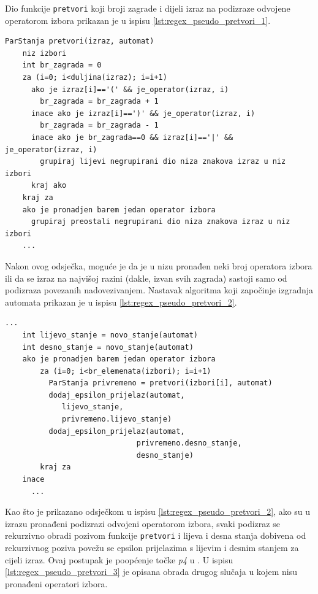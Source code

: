 \documentclass[times, 12pt, utf8]{book}
\begin{document}
Dio funkcije \verb|pretvori| koji broji zagrade i dijeli izraz na podizraze odvojene operatorom izbora prikazan je u ispisu \ref{lst:regex_pseudo_pretvori_1}.

\begin{lstlisting}[caption={Početak funkcije \texttt{pretvori}.},label=lst:regex_pseudo_pretvori_1]
ParStanja pretvori(izraz, automat)
	niz izbori
	int br_zagrada = 0
	za (i=0; i<duljina(izraz); i=i+1)
	  ako je izraz[i]=='(' && je_operator(izraz, i)
	    br_zagrada = br_zagrada + 1
	  inace ako je izraz[i]==')' && je_operator(izraz, i)
	    br_zagrada = br_zagrada - 1
	  inace ako je br_zagrada==0 && izraz[i]=='|' && je_operator(izraz, i)
	    grupiraj lijevi negrupirani dio niza znakova izraz u niz izbori
	  kraj ako
	kraj za
	ako je pronadjen barem jedan operator izbora
	  grupiraj preostali negrupirani dio niza znakova izraz u niz izbori
	...
\end{lstlisting}

Nakon ovog odsječka, moguće je da je u nizu pronađen neki broj operatora izbora ili da se izraz na najvišoj razini (dakle, izvan svih zagrada) sastoji samo od podizraza povezanih nadovezivanjem.
Nastavak algoritma koji započinje izgradnja automata prikazan je u ispisu \ref{lst:regex_pseudo_pretvori_2}.

\begin{lstlisting}[caption={Nastavak funkcije \texttt{pretvori}.},label=lst:regex_pseudo_pretvori_2]
    ...
    int lijevo_stanje = novo_stanje(automat)
    int desno_stanje = novo_stanje(automat)
    ako je pronadjen barem jedan operator izbora
        za (i=0; i<br_elemenata(izbori); i=i+1)
          ParStanja privremeno = pretvori(izbori[i], automat)
          dodaj_epsilon_prijelaz(automat,
             lijevo_stanje,         
             privremeno.lijevo_stanje)
          dodaj_epsilon_prijelaz(automat,
                              privremeno.desno_stanje,
                              desno_stanje)
        kraj za
    inace
      ...
\end{lstlisting}

Kao što je prikazano odsječkom u ispisu \ref{lst:regex_pseudo_pretvori_2}, ako su u izrazu pronađeni podizrazi odvojeni operatorom izbora, svaki podizraz se rekurzivno obradi pozivom funkcije \verb|pretvori| i lijeva i desna stanja dobivena od rekurzivnog poziva povežu se epsilon prijelazima s lijevim i desnim stanjem za cijeli izraz.
Ovaj postupak je poopćenje točke \emph{p4} u \cite[poglavlje 2.2.2]{utr}.
U ispisu \ref{lst:regex_pseudo_pretvori_3} je opisana obrada drugog slučaja u kojem nisu pronađeni operatori izbora.
\end{document}

